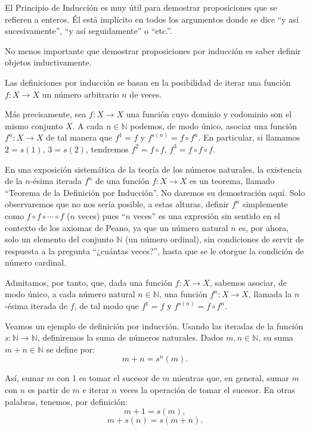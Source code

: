 \documentclass[12pt,oneside]{book}
\begin{document}
El Principio de Inducción es muy útil para demostrar proposiciones que se refieren a enteros. Él está implícito en todos los argumentos donde se dice “y así sucesivamente”, “y así seguidamente” o “etc.”.

No menos importante que demostrar proposiciones por inducción es saber definir objetos inductivamente.

Las definiciones por inducción se basan en la posibilidad de iterar una función \(f: X \to X\) un número arbitrario \(n\) de veces.

Más precisamente, sea \(f: X \to X\) una función cuyo dominio y codominio son el mismo conjunto \(X\). A cada \(n \in \mathbb{N}\) podemos, de modo único, asociar una función \(f^n: X \to X\) de tal manera que \(f^1 = f\) y \(f^{s(n)} = f \circ f^n\). En particular, si llamamos \(2 = s(1)\), \(3 = s(2)\), tendremos \(f^2 = f \circ f\), \(f^3 = f \circ f \circ f\).

En una exposición sistemática de la teoría de los números naturales, la existencia de la \(n\)-ésima iterada \(f^n\) de una función \(f: X \to X\) es un teorema, llamado “Teorema de la Definición por Inducción”. No daremos su demostración aquí. Solo observaremos que no nos sería posible, a estas alturas, definir \(f^n\) simplemente como \(f \circ f \circ \cdots \circ f\) (\(n\) veces) pues “\(n\) veces” es una expresión sin sentido en el contexto de los axiomas de Peano, ya que un número natural \(n\) es, por ahora, solo un elemento del conjunto \(\mathbb{N}\) (un número ordinal), sin condiciones de servir de respuesta a la pregunta “¿cuántas veces?”, hasta que se le otorgue la condición de número cardinal.

Admitamos, por tanto, que, dada una función \(f: X \to X\), sabemos asociar, de modo único, a cada número natural \(n \in \mathbb{N}\), una función \(f^n: X \to X\), llamada la \(n\)-ésima iterada de \(f\), de tal modo que \(f^1 = f\) y \(f^{s(n)} = f \circ f^n\).

Veamos un ejemplo de definición por inducción. Usando las iteradas de la función \(s: \mathbb{N} \to \mathbb{N}\), definiremos la suma de números naturales. Dados \(m, n \in \mathbb{N}\), su suma \(m + n \in \mathbb{N}\) se define por:
\[m + n = s^n(m).\]

Así, sumar \(m\) con 1 es tomar el sucesor de \(m\) mientras que, en general, sumar \(m\) con \(n\) es partir de \(m\) e iterar \(n\) veces la operación de tomar el sucesor. En otras palabras, tenemos, por definición:
\[m + 1 = s(m),\]
\[m + s(n) = s(m + n).\]
\end{document}
